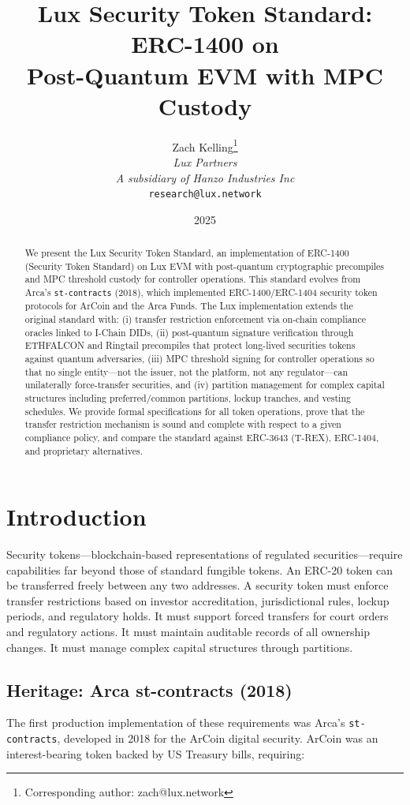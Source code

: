 \documentclass[11pt,a4paper]{article}
\title{Lux Security Token Standard: ERC-1400 on\\Post-Quantum EVM with MPC Custody}
\author{
Zach Kelling\thanks{Corresponding author: zach@lux.network}\\
\textit{Lux Partners}\\
\textit{A subsidiary of Hanzo Industries Inc}\\
\texttt{research@lux.network}
}
\date{2025}
\begin{document}
\luxcoverpage

\begin{abstract}
We present the Lux Security Token Standard, an implementation of ERC-1400 (Security Token Standard) on Lux EVM with post-quantum cryptographic precompiles and MPC threshold custody for controller operations. This standard evolves from Arca's \texttt{st-contracts} (2018), which implemented ERC-1400/ERC-1404 security token protocols for ArCoin and the Arca Funds. The Lux implementation extends the original standard with: (i) transfer restriction enforcement via on-chain compliance oracles linked to I-Chain DIDs, (ii) post-quantum signature verification through ETHFALCON and Ringtail precompiles that protect long-lived securities tokens against quantum adversaries, (iii) MPC threshold signing for controller operations so that no single entity---not the issuer, not the platform, not any regulator---can unilaterally force-transfer securities, and (iv) partition management for complex capital structures including preferred/common partitions, lockup tranches, and vesting schedules. We provide formal specifications for all token operations, prove that the transfer restriction mechanism is sound and complete with respect to a given compliance policy, and compare the standard against ERC-3643 (T-REX), ERC-1404, and proprietary alternatives.
\end{abstract}

\section{Introduction}

Security tokens---blockchain-based representations of regulated securities---require capabilities far beyond those of standard fungible tokens. An ERC-20 token can be transferred freely between any two addresses. A security token must enforce transfer restrictions based on investor accreditation, jurisdictional rules, lockup periods, and regulatory holds. It must support forced transfers for court orders and regulatory actions. It must maintain auditable records of all ownership changes. It must manage complex capital structures through partitions.

\subsection{Heritage: Arca st-contracts (2018)}

The first production implementation of these requirements was Arca's \texttt{st-contracts}, developed in 2018 for the ArCoin digital security. ArCoin was an interest-bearing token backed by US Treasury bills, requiring:
\end{document}
